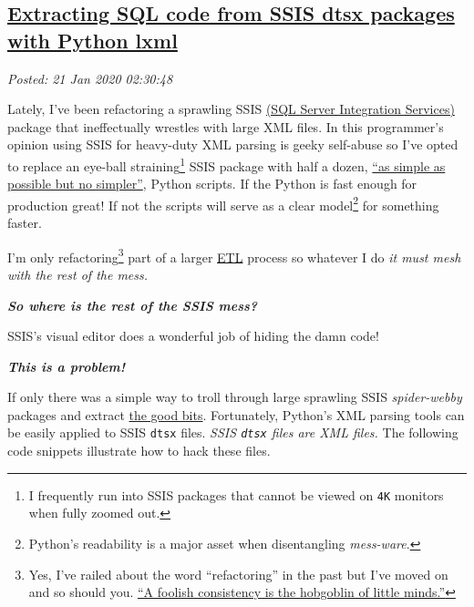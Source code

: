 %

\subsection*{\href{http://analyzethedatanotthedrivel.org/2020/01/20/extracting-sql-code-from-ssis-dtsx-packages-with-python-lxml/}{Extracting SQL code from SSIS dtsx packages with Python lxml}}


\noindent\emph{Posted: 21 Jan 2020 02:30:48}
\vspace{6pt}

Lately, I've been refactoring a sprawling SSIS
\href{https://docs.microsoft.com/en-us/sql/integration-services/sql-server-integration-services?view=sql-server-ver15}{(SQL
Server Integration Services)} package that ineffectually wrestles with
large XML files. In this programmer's opinion using SSIS for heavy-duty
XML parsing is geeky self-abuse so I've opted to replace an eye-ball
straining\footnote{
I frequently run into SSIS packages that cannot be viewed on \texttt{4K}
monitors when fully zoomed out.
} SSIS package
with half a dozen,
\href{https://quoteinvestigator.com/2011/05/13/einstein-simple/}{``as
simple as possible but no simpler''}, Python scripts. If the Python is
fast enough for production great! If not the scripts will serve as a
clear model\footnote{
Python's readability is a major asset when disentangling \emph{mess-ware}.
} for something faster.

I'm only refactoring\footnote{
Yes, I've railed about the word ``refactoring'' in the past but I've
moved on and so should you.
\href{https://www.dictionary.com/browse/a-foolish-consistency-is-the-hobgoblin-of-little-minds}{``A
foolish consistency is the hobgoblin of little minds.''}
} part of a larger \href{https://www.webopedia.com/TERM/E/ETL.html}{ETL}
process so whatever I do \emph{it must mesh with the rest of the mess.}

\medskip

\textbf{\emph{So where is the rest of the SSIS mess?}}

\medskip

SSIS's visual editor does a wonderful job of hiding the damn code!

\medskip

\textbf{\emph{This is a problem!}}

\medskip

If only there was a simple way to troll through large sprawling SSIS
\emph{spider-webby} packages and extract
\href{https://www.youtube.com/watch?v=wPiHQ37gXnE}{the good bits}.
Fortunately, Python's XML parsing tools can be easily applied to SSIS
\texttt{dtsx} files. \emph{SSIS \texttt{dtsx} files are XML files.} The
following code snippets illustrate how to hack these files.

